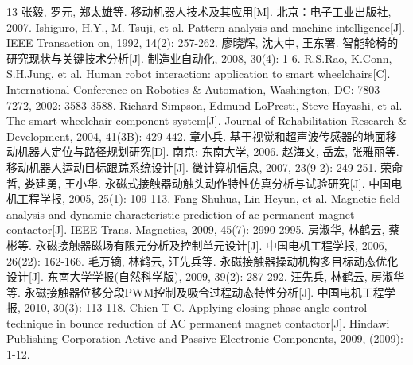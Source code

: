 \documentclass{seu-report}
\begin{document}
\begin{thebibliography}{13}
 张毅, 罗元, 郑太雄等. 移动机器人技术及其应用[M]. 北京：电子工业出版社, 2007.
 Ishiguro, H.Y., M. Tsuji, et al. Pattern analysis and machine intelligence[J]. IEEE Transaction on, 1992, 14(2): 257-262.
 廖晓辉, 沈大中, 王东署. 智能轮椅的研究现状与关键技术分析[J]. 制造业自动化, 2008, 30(4): 1-6.
 R.S.Rao, K.Conn, S.H.Jung, et al. Human robot interaction: application to smart wheelchairs[C]. International Conference on Robotics \& Automation, Washington, DC: 7803-7272, 2002: 3583-3588.
 Richard Simpson, Edmund LoPresti, Steve Hayashi, et al. The smart wheelchair component system[J]. Journal of Rehabilitation Research \& Development, 2004, 41(3B): 429-442.
 章小兵. 基于视觉和超声波传感器的地面移动机器人定位与路径规划研究[D]. 南京: 东南大学, 2006.
 赵海文, 岳宏, 张雅丽等. 移动机器人运动目标跟踪系统设计[J]. 微计算机信息, 2007, 23(9-2): 249-251.
 荣命哲, 娄建勇, 王小华. 永磁式接触器动触头动作特性仿真分析与试验研究[J]. 中国电机工程学报, 2005, 25(1): 109-113.
 Fang Shuhua, Lin Heyun, et al. Magnetic field analysis and dynamic characteristic prediction of ac permanent-magnet contactor[J]. IEEE Trans. Magnetics, 2009, 45(7): 2990-2995.
 房淑华, 林鹤云, 蔡彬等. 永磁接触器磁场有限元分析及控制单元设计[J]. 中国电机工程学报, 2006, 26(22): 162-166.
 毛万镝, 林鹤云, 汪先兵等. 永磁接触器操动机构多目标动态优化设计[J]. 东南大学学报(自然科学版), 2009, 39(2): 287-292.
 汪先兵, 林鹤云, 房淑华等. 永磁接触器位移分段PWM控制及吸合过程动态特性分析[J]. 中国电机工程学报, 2010, 30(3): 113-118.
 Chien T C. Applying closing phase-angle control technique in bounce reduction of AC permanent magnet contactor[J]. Hindawi Publishing Corporation Active and Passive Electronic Components, 2009, (2009): 1-12.
\end{thebibliography}
\end{document}
